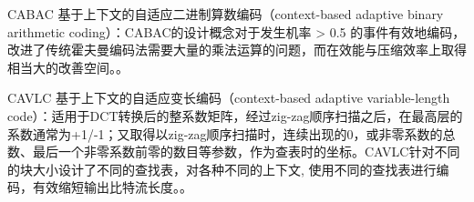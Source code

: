\begin{denotation}

\item[CABAC] 基于上下文的自适应二进制算数编码（context-based adaptive binary arithmetic coding）：CABAC的设计概念对于发生机率 > 0.5 的事件有效地编码，改进了传统霍夫曼编码法需要大量的乘法运算的问题，而在效能与压缩效率上取得相当大的改善空间。。
\item[CAVLC] 基于上下文的自适应变长编码（context-based adaptive variable-length code）：适用于DCT转换后的整系数矩阵，经过zig-zag顺序扫描之后，在最高层的系数通常为+1/-1；又取得以zig-zag顺序扫描时，连续出现的0，或非零系数的总数、最后一个非零系数前零的数目等参数，作为查表时的坐标。CAVLC针对不同的块大小设计了不同的查找表，对各种不同的上下文, 使用不同的查找表进行编码，有效缩短输出比特流长度。。


\end{denotation}
